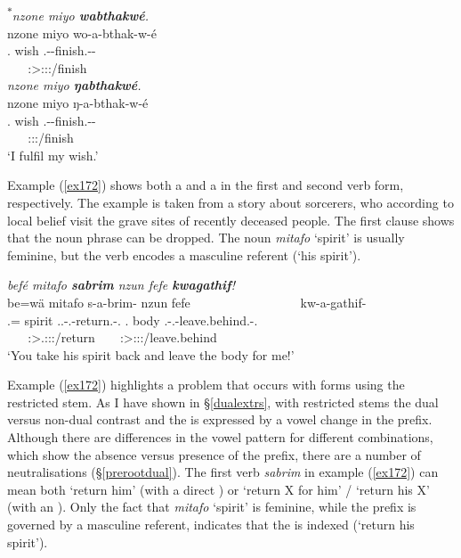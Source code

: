 \begin{exe}
\ex
\label{autoben}
\begin{xlist}
	\ex \textsuperscript{$\ast$}\textit{nzone miyo \textbf{wabthakwé}.}\\
	\glll nzone miyo wo-a-bthak-w-é\\
	\Fsg.{\Poss} wish \Fsg.\Alph-\Vc-finish.\Ext-\Ndu-\Fsg{}\\
	~ ~ {\footnotesize \Fsg:\Sbj>\Fsg:\Io:\Nonpast:\Ipfv/finish}\\
	\label{autoben1}
	\ex \textit{nzone miyo \textbf{ŋabthakwé}.}\\
	\glll nzone miyo ŋ-a-bthak-w-é\\
	\Fsg.{\Poss} wish \M.\Alph-\Vc-finish.\Ext-\Ndu-\Fsg{}\\
	~ ~ {\footnotesize \Fsg:\Sbj:\Nonpast:\Ipfv/finish}\\	
	\trans `I fulfil my wish.'
	\label{autoben2}
\end{xlist}
\end{exe}

Example (\ref{ex172}) shows both a  and a  in the first and second verb form, respectively. The example is taken from a story about sorcerers, who \textendash{} according to local belief \textendash{} visit the grave sites of recently deceased people. The first clause shows that the  noun phrase can be dropped. The noun \emph{mitafo} `spirit' is usually feminine, but the verb encodes a masculine referent (`his spirit').

\begin{exe}
	\ex \emph{befé mitafo \textbf{sabrim} nzun fefe \textbf{kwagathif}!}\\
	\glll be=wä mitafo s-a-brim-\Zero{} nzun fefe~~~~~~~~~~~~~~~~~ kw-a-gathif-\Zero{}\\
	\Ssg.\Erg={\Emph} spirit \Tsg.\Masc.\Bet{}-\Vc.\Ndu-return.\Rs-\Ssg.{\Imp} \Fsg.{\Dat} body \Fsg.\Bet-\Vc.\Ndu-leave.behind.\Rs-\Ssg.{\Imp}\\
	~ ~ {\footnotesize \Ssg:\Sbj>\Tsg.\Masc:\Io:\Imp:\Pfv/return} ~ ~ {\footnotesize \Ssg:\Sbj>\Fsg:\Io:\Imp:\Pfv/leave.behind}\\
	\trans `You take his spirit back and leave the body for me!' 
	\label{ex172}
\end{exe}

Example (\ref{ex172}) highlights a problem that occurs with  forms using the restricted stem. As I have shown in {\S}\ref{dualextrs}, with restricted stems the dual versus non-dual contrast and the  is expressed by a vowel change in the prefix. Although there are differences in the vowel pattern for different  combinations, which show the absence versus presence of the  prefix, there are a number of neutralisations ({\S}\ref{prerootdual}). The first verb \emph{sabrim} in example (\ref{ex172}) can mean both `return him' (with a direct ) or `return X for him' / `return his X' (with an ). Only the fact that \emph{mitafo} `spirit' is feminine, while the prefix is governed by a masculine referent, indicates that the  is indexed (`return his spirit').

